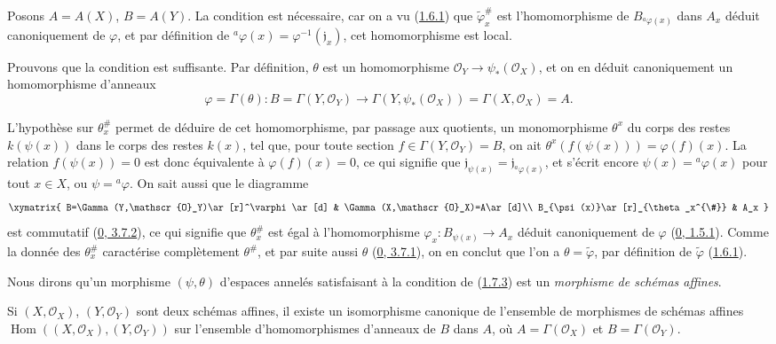 Posons $A=A(X)$, $B=A(Y)$. La condition est nécessaire, car on a vu
(\hyperref[I.1.6.1-fr]{1.6.1}) que $\widetilde\varphi_x^{\#}$ est
l'homomorphisme de $B_{{}^a\varphi(x)}$ dans $A_x$ déduit canoniquement de
$\varphi$, et par définition de
${}^a\varphi(x)=\varphi^{-1}(\mathfrak{j}_x)$, cet homomorphisme est local.

Prouvons que la condition est suffisante. Par définition, $\theta$ est un
homomorphisme $\mathscr{O}_Y\to\psi_*(\mathscr{O}_X)$, et on en déduit
canoniquement un homomorphisme d'anneaux
\[
  \varphi=\Gamma(\theta):
  B=\Gamma(Y,\mathscr{O}_Y)
  \longrightarrow
  \Gamma(Y,\psi_*(\mathscr{O}_X))=\Gamma(X,\mathscr{O}_X)=A.
\]

L'hypothèse sur $\theta_x^{\#}$ permet de déduire de cet homomorphisme, par
passage aux quotients, un monomorphisme $\theta^x$ du corps des restes
$k(\psi(x))$ dans le corps des restes $k(x)$, tel que, pour toute section
$f\in\Gamma(Y,\mathscr{O}_Y)=B$, on ait
$\theta^x(f(\psi(x)))=\varphi(f)(x)$. La relation $f(\psi(x))=0$ est donc
équivalente à $\varphi(f)(x)=0$, ce qui signifie que
$\mathfrak{j}_{\psi(x)}=\mathfrak{j}_{{}^a\varphi(x)}$, et s'écrit encore
$\psi(x)={}^a\varphi(x)$ pour tout $x\in X$, ou $\psi={}^a\varphi$. On sait
aussi que le diagramme
\label{I.1.7.3.diagram-fr}
\[
  \xymatrix{
    B=\Gamma(Y,\mathscr{O}_Y)\ar[r]^\varphi\ar[d] &
    \Gamma(X,\mathscr{O}_X)=A\ar[d]\\
    B_{\psi(x)}\ar[r]_{\theta_x^{\#}} & A_x
  }
\]
est commutatif (\hyperref[0.3.7.2-fr]{0, 3.7.2}), ce qui signifie que
$\theta_x^{\#}$ est égal à l'homomorphisme
$\varphi_x:B_{\psi(x)}\to A_x$ déduit canoniquement de $\varphi$
(\hyperref[0.1.5.1-fr]{0, 1.5.1}). Comme la donnée des $\theta_x^{\#}$
caractérise complètement $\theta^{\#}$, et par suite aussi $\theta$
(\hyperref[0.3.7.1-fr]{0, 3.7.1}), on en conclut que l'on a
$\theta=\widetilde\varphi$, par définition de $\widetilde\varphi$
(\hyperref[I.1.6.1-fr]{1.6.1}).

Nous dirons qu'un morphisme $(\psi,\theta)$ d'espaces annelés satisfaisant à
la condition de (\hyperref[I.1.7.3-fr]{1.7.3}) est un \emph{morphisme de
schémas affines}.

\begin{corollary}[1.7.4]
\label{I.1.7.4-fr}
Si $(X,\mathscr{O}_X)$, $(Y,\mathscr{O}_Y)$ sont deux schémas affines, il
existe un isomorphisme canonique de l'ensemble de morphismes de schémas
affines
$\operatorname{Hom}((X,\mathscr{O}_X),(Y,\mathscr{O}_Y))$ sur l'ensemble
d'homomorphismes d'anneaux de $B$ dans $A$, où
$A=\Gamma(\mathscr{O}_X)$ et $B=\Gamma(\mathscr{O}_Y)$.
\end{corollary}

